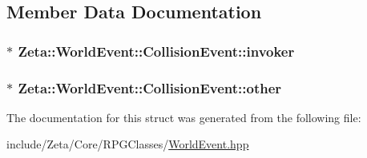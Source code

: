 \subsection{Member Data Documentation}
\hypertarget{structZeta_1_1WorldEvent_1_1CollisionEvent_aaf69fb5dd0c843c4cd2ee87f0ab43010}{
\subsubsection[{invoker}]{$\ast$ Zeta\+::\+World\+Event\+::\+Collision\+Event\+::invoker}}\label{structZeta_1_1WorldEvent_1_1CollisionEvent_aaf69fb5dd0c843c4cd2ee87f0ab43010}
\hypertarget{structZeta_1_1WorldEvent_1_1CollisionEvent_ac9b2b1215997c379ef4329e4548a977d}{
\subsubsection[{other}]{$\ast$ Zeta\+::\+World\+Event\+::\+Collision\+Event\+::other}}\label{structZeta_1_1WorldEvent_1_1CollisionEvent_ac9b2b1215997c379ef4329e4548a977d}


The documentation for this struct was generated from the following file\+:\begin{DoxyCompactItemize}
\item 
include/\+Zeta/\+Core/\+R\+P\+G\+Classes/\hyperlink{WorldEvent_8hpp}{World\+Event.\+hpp}\end{DoxyCompactItemize}
